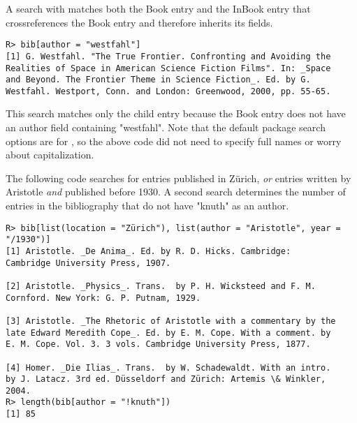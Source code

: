 \documentclass[article]{jss}\usepackage[]{graphicx}\usepackage[]{color}
\makeatletter
\newenvironment{kframe}{%
 \def\at@end@of@kframe{}%
 \ifinner\ifhmode%
  \def\at@end@of@kframe{\end{minipage}}%
  \begin{minipage}{\columnwidth}%
 \fi\fi%
 \def\FrameCommand##1{\hskip\@totalleftmargin \hskip-\fboxsep
 \colorbox{shadecolor}{##1}\hskip-\fboxsep
     \hskip-\linewidth \hskip-\@totalleftmargin \hskip\columnwidth}%
 \MakeFramed {\advance\hsize-\width
   \@totalleftmargin\z@ \linewidth\hsize
   \@setminipage}}%
 {\par\unskip\endMakeFramed%
 \at@end@of@kframe}
\newenvironment{knitrout}{}{} %
\makeatother
\begin{document}
A search with  matches both the Book entry and the InBook entry that crossreferences the Book entry and therefore inherits its fields.  
\begin{knitrout}
\color{fgcolor}\begin{kframe}
\begin{verbatim}
R> bib[author = "westfahl"]
[1] G. Westfahl. "The True Frontier. Confronting and Avoiding the
Realities of Space in American Science Fiction Films". In: _Space
and Beyond. The Frontier Theme in Science Fiction_. Ed. by G.
Westfahl. Westport, Conn. and London: Greenwood, 2000, pp. 55-65.
\end{verbatim}
\end{kframe}
\end{knitrout}

This search matches only the child entry because the Book entry does not have an author field containing "westfahl".  Note that the default package search options are for , so the above code did not need to specify full names or worry about capitalization.

The following code searches for entries published in Zürich, \emph{or} entries written by Aristotle \emph{and} published before 1930.  A second search determines the number of entries in the bibliography that do not have "knuth" as an author.
\begin{knitrout}
\color{fgcolor}\begin{kframe}
\begin{verbatim}
R> bib[list(location = "Zürich"), list(author = "Aristotle", year = "/1930")]
[1] Aristotle. _De Anima_. Ed. by R. D. Hicks. Cambridge:
Cambridge University Press, 1907.

[2] Aristotle. _Physics_. Trans.  by P. H. Wicksteed and F. M.
Cornford. New York: G. P. Putnam, 1929.

[3] Aristotle. _The Rhetoric of Aristotle with a commentary by the
late Edward Meredith Cope_. Ed. by E. M. Cope. With a comment. by
E. M. Cope. Vol. 3. 3 vols. Cambridge University Press, 1877.

[4] Homer. _Die Ilias_. Trans.  by W. Schadewaldt. With an intro.
by J. Latacz. 3rd ed. Düsseldorf and Zürich: Artemis \& Winkler,
2004.
R> length(bib[author = "!knuth"])
[1] 85
\end{verbatim}
\end{kframe}
\end{knitrout}
\end{document}
